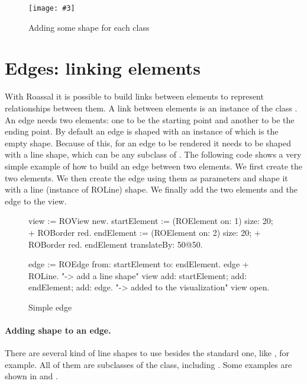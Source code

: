 \documentclass[a4paper,10pt,twoside]{book}
\newcommand{\fig}[4]{
		\begin{figure}[#1]
			\centering
			\texttt{[image: \#3]}
			\caption{\label{fig:#3}#4}
		\end{figure}}
\begin{document}
\fig{H}{0.6}{hier2}{Adding some shape for each class}


\section{Edges: linking elements} 

With Roassal it is possible to build links between elements to represent relationships between them. A link between elements is an instance of the class . An edge needs two elements: one to be the starting point and another to be the ending point. 
By default an edge is shaped with an instance of  which is the empty shape. Because of this, for an edge to be rendered it needs to be shaped with a line shape, which can be any subclass of .
The following code shows a very simple example of how to build an edge between two elements. We first create the two elements. We then create the edge using them as parameters and shape it with a line (instance of ROLine) shape. We finally add the two elements and the edge to the view.

\begin{figure}[H]
 \begin{code}{}
view := ROView new.
startElement := (ROElement on: 1) size: 20; + ROBorder red.
endElement := (ROElement on: 2)  size: 20; + ROBorder red.
endElement translateBy: 50@50.

edge := ROEdge from: startElement to: endElement.
edge + ROLine. "-> add a line shape"
view 
	add: startElement; 
	add: endElement; 
	add: edge. "-> added to the visualization"
view open.
\end{code}   
\caption{Simple edge}
\label{fig:simpleEdge}
\end{figure} 

\paragraph{Adding shape to an edge.}
There are several kind of line shapes to use besides the standard one, like , for example. All of them are subclasses of the  class, including . 
Some examples are shown in  and .
\end{document}
